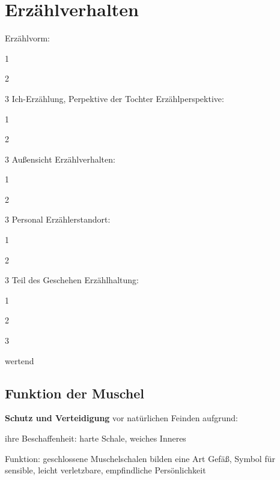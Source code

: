 \section{Erzählverhalten}

\startplacetable[location={here,none},title={}]
\setupTABLE[c][2][loffset=0.5cm]
\bTABLE[frame=off]
\bTR 
	\bTD [background=color,backgroundcolor=gray] Erzählvorm: \eTD 
	\bTD [nr=2]
\startitemize[packed]
\item 1	
\item 2	
\item 3	
\stopitemize
	\eTD
\eTR
\bTR
	\bTD Ich-Erzählung, Perpektive der Tochter \eTD 
\eTR
\bTR 
	\bTD [background=color,backgroundcolor=gray] Erzählperspektive: \eTD 
	\bTD [nr=2]
\startitemize[packed]
\item 1	
\item 2	
\item 3	
\stopitemize
	\eTD
\eTR
\bTR
	\bTD Außensicht \eTD 
\eTR
\bTR 
	\bTD [background=color,backgroundcolor=gray] Erzählverhalten: \eTD 
	\bTD [nr=2]
\startitemize[packed]
\item 1	
\item 2	
\item 3	
\stopitemize
	\eTD
\eTR
\bTR
	\bTD Personal \eTD 
\eTR
\bTR 
	\bTD [background=color,backgroundcolor=gray] Erzählerstandort: \eTD 
	\bTD [nr=2]
\startitemize[packed]
\item 1	
\item 2	
\item 3	
\stopitemize
	\eTD
\eTR
\bTR
	\bTD Teil des Geschehen \eTD 
\eTR
\bTR 
	\bTD [background=color,backgroundcolor=gray] Erzählhaltung: \eTD 
	\bTD [nr=2]
\startitemize[packed]
\item 1	
\item 2	
\item 3	
\stopitemize
	\eTD

\eTR
\bTR
	\bTD wertend \eTD 
\eTR
\eTABLE
\stopplacetable

\subsection{Funktion der Muschel}

\startitemize[packed]
\item {\bf Schutz und Verteidigung} vor natürlichen Feinden aufgrund:
\startitemize[packed]
\item ihre Beschaffenheit: harte Schale, weiches Inneres
\item Funktion: geschlossene Muschelschalen bilden eine Art Gefäß, Symbol für sensible, leicht verletzbare, empfindliche Persönlichkeit
\stopitemize

